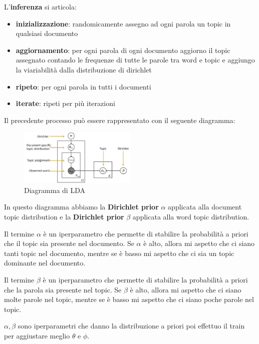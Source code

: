L'\textbf{inferenza} si articola:
\begin{itemize}
      \item \textbf{inizializzazione}: randomicamente assegno ad ogni parola un
            topic in qualsiasi documento
      \item \textbf{aggiornamento}: per ogni parola di ogni documento aggiorno il
            topic assegnato contando le frequenze di tutte le parole tra word e topic e
            aggiungo la viariabilità dalla distribuzione di dirichlet
      \item \textbf{ripeto}: per ogni parola in tutti i documenti
      \item \textbf{iterate}: ripeti per più iterazioni
\end{itemize}
Il precedente processo può essere rappresentato con il seguente diagramma:
\begin{figure}[!ht]
      \centering
      \includegraphics[width=0.5\textwidth]{./img/nlp/lda.png}
      \caption{Diagramma di LDA}
      \label{fig:lda}
\end{figure}
In questo diagramma abbiamo la \textbf{Dirichlet prior} $\alpha$ applicata alla
document topic distribution e la \textbf{Dirichlet prior} $\beta$ applicata alla
word topic distribution.

Il termine $\alpha$ è un iperparametro che permette di stabilire la probabilità
a priori che il topic sia presente nel documento. Se $\alpha$ è alto, allora mi
aspetto che ci siano tanti topic nel documento, mentre se è basso mi aspetto che
ci sia un topic dominante nel documento.

Il termine $\beta$ è un iperparametro che permette di stabilire la probabilità
a priori che la parola sia presente nel topic. Se $\beta$ è alto, allora mi aspetto
che ci siano molte parole nel topic, mentre se è basso mi aspetto che ci siano
poche parole nel topic.

$\alpha, \beta$ sono iperparametri che danno la distribuzione a priori poi effettuo
il train per aggiustare meglio $\theta$ e $\phi$.

